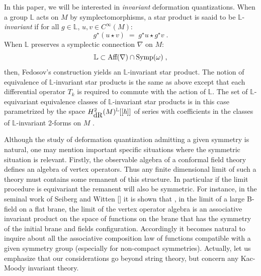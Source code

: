\documentclass{article}
\newcommand{\LL}{\mathbb L}
\begin{document}
\noindent  In this paper, we will be interested in {\sl invariant} deformation quantizations. When a group $\LL$ acts on $M$ by symplectomorphisms, a star product is saaid to be $\LL$- {\sl invariant}
if for all $g\in\LL$, $u,v\in C^\infty(M)$:
\begin{equation}
g^\star(u\star v)\;=\;g^\star u\star g^\star v\;.
\end{equation}
When $\LL$ preserves a symplectic connection $\nabla$ on $M$:
\begin{equation}
\LL\subset\mbox{\rm Aff}(\nabla)\cap\mbox{\rm Symp}(\omega)\;,
\end{equation}
then, Fedosov's construction yields an $\LL$-invariant star product. The notion of equivalence
of $\LL$-invariant star products is the same as above except that each differential operator $T_k$
is required to commute with the action of $\LL$. The set of $\LL$-equivariant equivalence classes
of $\LL$-invariant star products is in this case parametrized by the space $H^2_{\mbox{\rm dR}}(M)^\LL[[\hbar]]$
of series with coefficients in the classes of $\LL$-invariant 2-forms on $M$ \cite{BBG}.

\vspace{2mm}

\noindent Although the study of deformation quantization admitting  a given symmetry is natural, one may 
mention important specific situations where the symmetric situation is relevant. 
Firstly, the observable algebra of a conformal field theory defines an algebra of vertex operators. Thus any finite dimensional limit of such a theory must contains some remanent of this structure. In particular if the limit procedure is equivariant the remanent will also be symmetric. For instance, in the seminal work of Seiberg and Witten [\cite{SeibWitt}] it is shown that , in the limit of a large B-field on a flat brane, the limit of the vertex operator algebra is an associative invariant product on the space of functions on the brane that has the symmetry of the initial brane and fields configuration. Accordingly it becomes natural to inquire about all the associative composition law of functions compatible with a given symmetry group (especially for non-compact symmetries). Actually, let us emphasize that our considerations go beyond string theory, but concern any Kac-Moody invariant theory.
\end{document}
